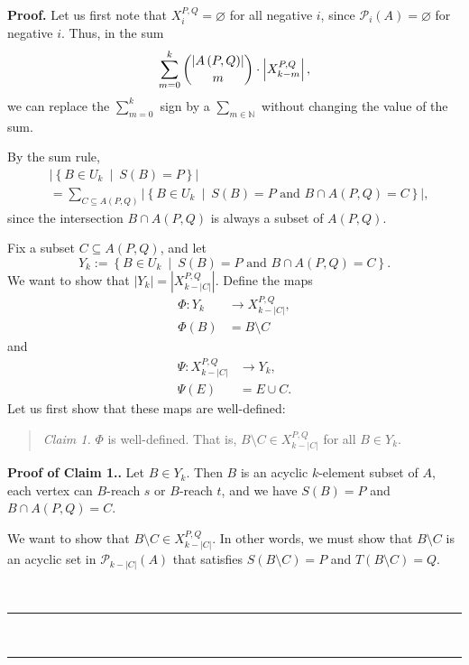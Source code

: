 \documentclass[numbers=enddot,12pt,final,onecolumn,notitlepage]{scrartcl}%
\theoremstyle{definition}
\newenvironment{statement}{\begin{quote}}{\end{quote}}
\newenvironment{proof}[1][Proof]{\noindent\textbf{#1.} }{\ \rule{0.5em}{0.5em}}
\let\sumnonlimits\sum
\renewcommand{\sum}{\sumnonlimits\limits}
\theoremstyle{plainsl}
\begin{document}
\begin{proof}
Let us first note that $X_{i}^{P,Q}=\varnothing$ for all negative $i$, since
$\mathcal{P}_{i}\left(  A\right)  =\varnothing$ for negative $i$. Thus, in the
sum%
\[
\sum_{m=0}^{k}\dbinom{\left\vert A\left(  P,Q\right)  \right\vert }{m}%
\cdot\left\vert X_{k-m}^{P,Q}\right\vert ,
\]
we can replace the $\sum_{m=0}^{k}$ sign by a $\sum_{m\in\mathbb{N}}$ without
changing the value of the sum.

By the sum rule,
\begin{align}
&  \left\vert \left\{  B\in U_{k}\ \mid\ S\left(  B\right)  =P\right\}
\right\vert \nonumber\\
&  =\sum_{C\subseteq A\left(  P,Q\right)  }\left\vert \left\{  B\in
U_{k}\ \mid\ S\left(  B\right)  =P\text{ and }B\cap A\left(  P,Q\right)
=C\right\}  \right\vert , \label{pf.lem.new4.sum}%
\end{align}
since the intersection $B\cap A\left(  P,Q\right)  $ is always a subset of
$A\left(  P,Q\right)  $.

Fix a subset $C\subseteq A(P,Q)$, and let
\[
Y_{k}:=\left\{  B\in U_{k}\ \mid\ S\left(  B\right)  =P\text{ and }B\cap
A\left(  P,Q\right)  =C\right\}  .
\]
We want to show that $\left\vert Y_{k}\right\vert =\left\vert X_{k-|C|}%
^{P,Q}\right\vert $. Define the maps
\begin{align*}
\Phi:Y_{k}  &  \rightarrow X_{k-|C|}^{P,Q},\\
\Phi(B)  &  =B\setminus C
\end{align*}
and
\begin{align*}
\Psi:X_{k-|C|}^{P,Q}  &\rightarrow Y_{k},\\
\Psi(E)  &  =E\cup C.
\end{align*}
Let us first show that these maps are well-defined:

\begin{statement}
\textit{Claim 1.} $\Phi$ is well-defined. That is, $B\setminus C\in
X_{k-|C|}^{P,Q}$ for all $B\in Y_{k}$.
\end{statement}

\begin{proof}[Proof of Claim 1.]
    Let $B \in Y_{k}$. Then $B$ is an acyclic $k$-element subset of $A$, each vertex can $B$-reach $s$ or $B$-reach $t$, and we have $S(B) = P$ and $B \cap A(P,Q) = C$.

    We want to show that $B \setminus C \in X_{k-|C|}^{P,Q}$. In other words, we must show that $B \setminus C$ is an acyclic set in $\mathcal{P}_{k-|C|}(A)$ that satisfies $S(B\setminus C) = P$ and $T(B\setminus C) = Q$.


\end{proof}
\end{proof}
\end{document}
